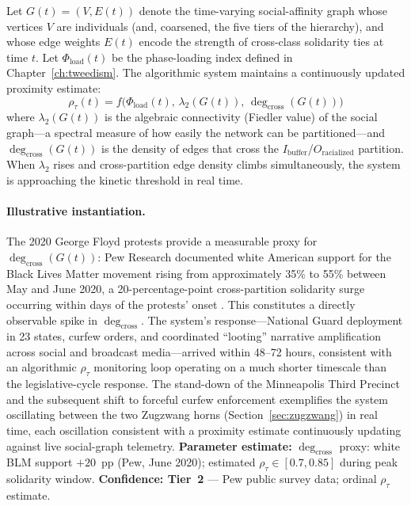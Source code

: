 Let $G(t) = (V, E(t))$ denote the time-varying social-affinity graph whose vertices $V$ are individuals (and, coarsened, the five tiers of the hierarchy), and whose edge weights $E(t)$ encode the strength of cross-class solidarity ties at time $t$. Let $\Phi_{\text{load}}(t)$ be the phase-loading index defined in Chapter~\ref{ch:tweedism}. The algorithmic system maintains a continuously updated proximity estimate:
\begin{equation}\label{eq:14.2-realtime-proximity-estimate}
\rho_{\tau}(t) = f\bigl(\Phi_{\text{load}}(t),\, \lambda_2(G(t)),\, \deg_{\text{cross}}(G(t))\bigr)
\end{equation}
where $\lambda_2(G(t))$ is the algebraic connectivity (Fiedler value) of the social graph---a spectral measure of how easily the network can be partitioned---and $\deg_{\text{cross}}(G(t))$ is the density of edges that cross the $I_{\text{buffer}}$/$O_{\text{racialized}}$ partition. When $\lambda_2$ rises and cross-partition edge density climbs simultaneously, the system is approaching the kinetic threshold in real time.

\paragraph{Illustrative instantiation.}
The 2020 George Floyd protests provide a measurable proxy for $\deg_{\text{cross}}(G(t))$: Pew Research documented white American support for the Black Lives Matter movement rising from approximately 35\% to 55\% between May and June 2020, a 20-percentage-point cross-partition solidarity surge occurring within days of the protests' onset \cite{pew_blm_2020}. This constitutes a directly observable spike in $\deg_{\text{cross}}$. The system's response---National Guard deployment in 23 states, curfew orders, and coordinated ``looting'' narrative amplification across social and broadcast media---arrived within 48--72 hours, consistent with an algorithmic $\rho_\tau$ monitoring loop operating on a much shorter timescale than the legislative-cycle response. The stand-down of the Minneapolis Third Precinct and the subsequent shift to forceful curfew enforcement exemplifies the system oscillating between the two Zugzwang horns (Section~\ref{sec:zugzwang}) in real time, each oscillation consistent with a proximity estimate continuously updating against live social-graph telemetry. \textbf{Parameter estimate:} $\deg_{\text{cross}}$ proxy: white BLM support $+20$~pp (Pew, June 2020); estimated $\rho_\tau \in [0.7, 0.85]$ during peak solidarity window. \textbf{Confidence: Tier~2} --- Pew public survey data; ordinal $\rho_\tau$ estimate.

